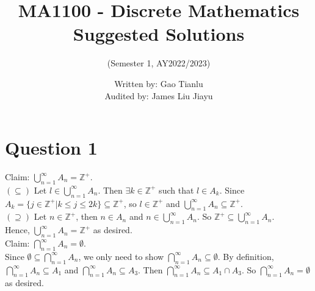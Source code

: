 \documentclass[11pt]{article}
\title{MA1100 - Discrete Mathematics Suggested Solutions}
\author{(Semester 1, AY2022/2023)}
\date{Written by: Gao Tianlu\\Audited by: James Liu Jiayu}
\begin{document}
\maketitle
\section*{Question 1}
Claim: $\bigcup_{n=1}^\infty A_n = \mathbb{Z}^+$.\\
$(\subseteq)$ Let $l\in \bigcup_{n=1}^\infty A_n.$ Then $\exists k\in \mathbb{Z}^+$ such that $l\in A_k$. Since $A_k=\{j\in \mathbb{Z}^+|k\leq j \leq 2k\}\subseteq \mathbb{Z}^+$, so $l\in \mathbb{Z}^+$ and $\bigcup_{n=1}^\infty A_n \subseteq \mathbb{Z}^+$.\\
$(\supseteq)$ Let $n\in \mathbb{Z}^+$, then $n\in A_n$ and $n\in \bigcup_{n=1}^\infty A_n$. So $\mathbb{Z}^+\subseteq \bigcup_{n=1}^\infty A_n$.\\
Hence, $\bigcup_{n=1}^\infty A_n = \mathbb{Z}^+$ as desired.\\

Claim: $\bigcap_{n=1}^\infty A_n=\emptyset.$\\
Since $\emptyset \subseteq \bigcap_{n=1}^\infty A_n$, we only need to show $\bigcap_{n=1}^\infty A_n \subseteq \emptyset.$ By definition, $\bigcap_{n=1}^\infty A_n \subseteq A_1$ and $\bigcap_{n=1}^\infty A_n \subseteq A_3$. Then $\bigcap_{n=1}^\infty A_n \subseteq {A_1 \cap A_3}$. So $\bigcap_{n=1}^\infty A_n=\emptyset$ as desired.\\
\end{document}
